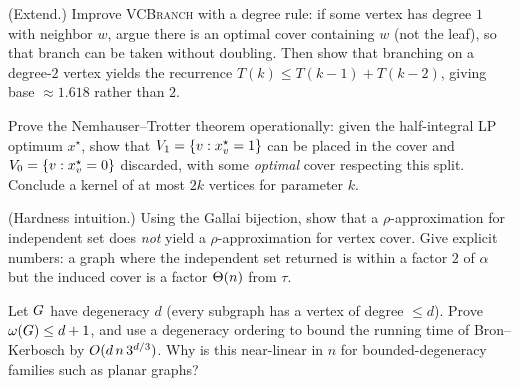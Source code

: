\begin{exercise}
(Extend.) Improve \textsc{VCBranch} with a degree rule: if some vertex has degree
$1$ with neighbor $w$, argue there is an optimal cover containing $w$ (not the
leaf), so that branch can be taken without doubling. Then show that branching on a
degree-$2$ vertex yields the recurrence $T(k)\le T(k-1)+T(k-2)$, giving base
$\approx 1.618$ rather than $2$.
\end{exercise}

\begin{exercise}
Prove the Nemhauser--Trotter theorem operationally: given the half-integral LP
optimum $x^\star$, show that $V_1=\{v:x^\star_v=1\}$ can be placed in the cover
and $V_0=\{v:x^\star_v=0\}$ discarded, with some \emph{optimal} cover respecting
this split. Conclude a kernel of at most $2k$ vertices for parameter $k$.
\end{exercise}

\begin{exercise}
(Hardness intuition.) Using the Gallai bijection, show that a
$\rho$-approximation for independent set does \emph{not} yield a
$\rho$-approximation for vertex cover. Give explicit numbers: a graph where the
independent set returned is within a factor $2$ of $\alpha$ but the induced cover
is a factor $\Theta(n)$ from $\tau$.
\end{exercise}

\begin{exercise}
Let $G$ have degeneracy $d$ (every subgraph has a vertex of degree $\le d$).
Prove $\omega(G)\le d+1$, and use a degeneracy ordering to bound the running
time of Bron--Kerbosch by $O(d\,n\,3^{d/3})$. Why is this near-linear in $n$ for
bounded-degeneracy families such as planar graphs?
\end{exercise}
